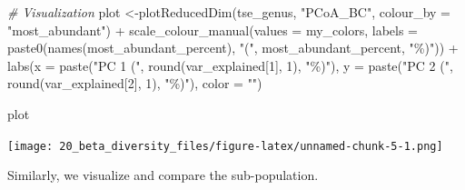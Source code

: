 \documentclass[
]{book}
\newenvironment{Shaded}{\begin{snugshade}}{\end{snugshade}}
\newcommand{\AttributeTok}[1]{\textcolor[rgb]{0.77,0.63,0.00}{#1}}
\newcommand{\CommentTok}[1]{\textcolor[rgb]{0.56,0.35,0.01}{\textit{#1}}}
\newcommand{\DecValTok}[1]{\textcolor[rgb]{0.00,0.00,0.81}{#1}}
\newcommand{\FunctionTok}[1]{\textcolor[rgb]{0.00,0.00,0.00}{#1}}
\newcommand{\NormalTok}[1]{#1}
\newcommand{\OtherTok}[1]{\textcolor[rgb]{0.56,0.35,0.01}{#1}}
\newcommand{\SpecialCharTok}[1]{\textcolor[rgb]{0.00,0.00,0.00}{#1}}
\newcommand{\StringTok}[1]{\textcolor[rgb]{0.31,0.60,0.02}{#1}}
\begin{document}
\begin{Shaded}
\begin{Highlighting}[]
\CommentTok{\# Visualization}
\NormalTok{plot }\OtherTok{\textless{}{-}}\FunctionTok{plotReducedDim}\NormalTok{(tse\_genus, }\StringTok{"PCoA\_BC"}\NormalTok{,}
                      \AttributeTok{colour\_by =} \StringTok{"most\_abundant"}\NormalTok{) }\SpecialCharTok{+}
  \FunctionTok{scale\_colour\_manual}\NormalTok{(}\AttributeTok{values =}\NormalTok{ my\_colors,}
                      \AttributeTok{labels =} \FunctionTok{paste0}\NormalTok{(}\FunctionTok{names}\NormalTok{(most\_abundant\_percent), }\StringTok{"("}\NormalTok{, most\_abundant\_percent, }\StringTok{"\%)"}\NormalTok{)) }\SpecialCharTok{+}
  \FunctionTok{labs}\NormalTok{(}\AttributeTok{x =} \FunctionTok{paste}\NormalTok{(}\StringTok{"PC 1 ("}\NormalTok{, }\FunctionTok{round}\NormalTok{(var\_explained[}\DecValTok{1}\NormalTok{], }\DecValTok{1}\NormalTok{), }\StringTok{"\%)"}\NormalTok{),}
       \AttributeTok{y =} \FunctionTok{paste}\NormalTok{(}\StringTok{"PC 2 ("}\NormalTok{, }\FunctionTok{round}\NormalTok{(var\_explained[}\DecValTok{2}\NormalTok{], }\DecValTok{1}\NormalTok{), }\StringTok{"\%)"}\NormalTok{),}
       \AttributeTok{color =} \StringTok{""}\NormalTok{)}

\NormalTok{plot}
\end{Highlighting}
\end{Shaded}

\texttt{[image: 20\_beta\_diversity\_files/figure-latex/unnamed-chunk-5-1.png]}

Similarly, we visualize and compare the sub-population.
\end{document}
